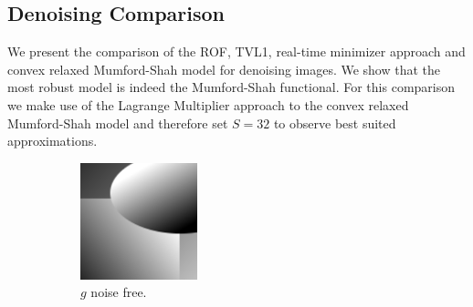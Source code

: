 \documentclass[abstracton]{scrreprt}
\begin{document}

        \subsection{Denoising Comparison} %
        \label{sub:denoising_comparison}

            We present the comparison of the ROF, TVL1, real-time minimizer approach and convex relaxed Mumford-Shah model for denoising images. We show that the most robust model is indeed the Mumford-Shah functional. For this comparison we make use of the Lagrange Multiplier approach to the convex relaxed Mumford-Shah model and therefore set $S = 32$ to observe best suited approximations.
            \begin{figure}[!ht]
                \centering
                \begin{subfigure}[b]{0.29\textwidth}
                    \includegraphics[width=\textwidth]{img/images/synth.png}
                    \caption{$g$ noise free.}
                \end{subfigure}
                \begin{subfigure}[b]{0.29\textwidth}

\end{subfigure}
\end{figure}
\end{document}
